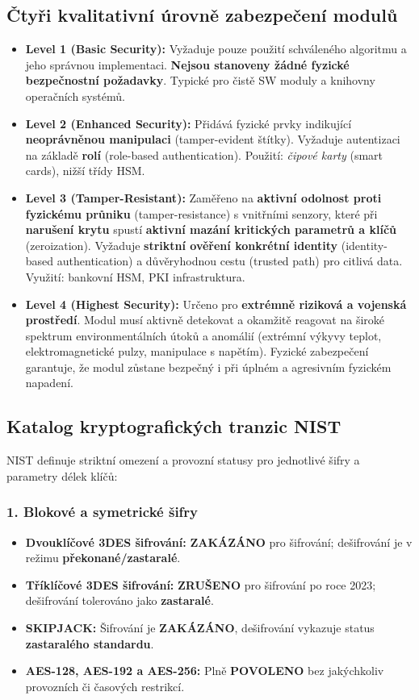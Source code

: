 \documentclass[10pt,a4paper]{article}
\begin{document}
	\subsection{Čtyři kvalitativní úrovně zabezpečení modulů}
	\begin{itemize}
		\item \textbf{Level 1 (Basic Security):} Vyžaduje pouze použití schváleného algoritmu a jeho správnou implementaci. \textbf{Nejsou stanoveny žádné fyzické bezpečnostní požadavky}. Typické pro čistě SW moduly a knihovny operačních systémů.
		
		\item \textbf{Level 2 (Enhanced Security):} Přidává fyzické prvky indikující \textbf{neoprávněnou manipulaci} (tamper-evident štítky). Vyžaduje autentizaci na základě \textbf{rolí} (role-based authentication). Použití: \textit{čipové karty} (smart cards), nižší třídy HSM.
		
		\item \textbf{Level 3 (Tamper-Resistant):} Zaměřeno na \textbf{aktivní odolnost proti fyzickému průniku} (tamper-resistance) s vnitřními senzory, které při \textbf{narušení krytu} spustí \textbf{aktivní mazání kritických parametrů a klíčů} (zeroization). 
		Vyžaduje \textbf{striktní ověření konkrétní identity} (identity-based authentication) a důvěryhodnou cestu (trusted path) pro citlivá data. Využití: bankovní HSM, PKI infrastruktura.
		
		\item \textbf{Level 4 (Highest Security):} Určeno pro \textbf{extrémně riziková a vojenská prostředí}. Modul musí aktivně detekovat a okamžitě reagovat na široké spektrum environmentálních útoků a anomálií (extrémní výkyvy teplot, elektromagnetické pulzy, manipulace s napětím). 
		Fyzické zabezpečení garantuje, že modul zůstane bezpečný i při úplném a agresivním fyzickém napadení.
	\end{itemize}
	
	\subsection{Katalog kryptografických tranzic NIST}
	NIST definuje striktní omezení a provozní statusy pro jednotlivé šifry a parametry délek klíčů:
	
	\subsubsection*{1. Blokové a symetrické šifry}
	\begin{itemize}
		\item \textbf{Dvouklíčové 3DES šifrování:} \textbf{ZAKÁZÁNO} pro šifrování; dešifrování je v režimu \textbf{překonané/zastaralé}.
		\item \textbf{Tříklíčové 3DES šifrování:} \textbf{ZRUŠENO} pro šifrování po roce 2023; dešifrování tolerováno jako \textbf{zastaralé}.
		\item \textbf{SKIPJACK:} Šifrování je \textbf{ZAKÁZÁNO}, dešifrování vykazuje status \textbf{zastaralého standardu}.
		\item \textbf{AES-128, AES-192 a AES-256:} Plně \textbf{POVOLENO} bez jakýchkoliv provozních či časových restrikcí.
	\end{itemize}
	
\end{document}
